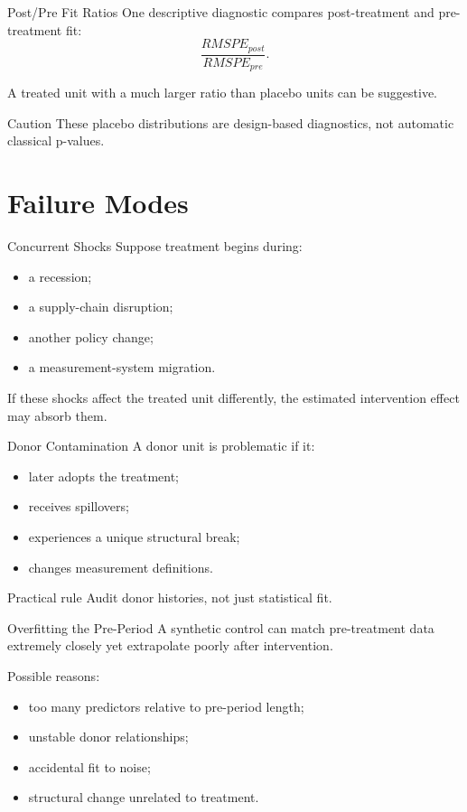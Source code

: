 \documentclass[aspectratio=169,11pt]{beamer}
\begin{document}
\begin{frame}{Post/Pre Fit Ratios}
One descriptive diagnostic compares post-treatment and pre-treatment fit:
\[
\frac{RMSPE_{post}}{RMSPE_{pre}}.
\]

A treated unit with a much larger ratio than placebo units can be suggestive.

\begin{alertblock}{Caution}
These placebo distributions are design-based diagnostics, not automatic classical p-values.
\end{alertblock}
\end{frame}

\section{Failure Modes}

\begin{frame}{Concurrent Shocks}
Suppose treatment begins during:
\begin{itemize}
\item a recession;
\item a supply-chain disruption;
\item another policy change;
\item a measurement-system migration.
\end{itemize}

If these shocks affect the treated unit differently, the estimated intervention effect may absorb them.
\end{frame}

\begin{frame}{Donor Contamination}
A donor unit is problematic if it:
\begin{itemize}
\item later adopts the treatment;
\item receives spillovers;
\item experiences a unique structural break;
\item changes measurement definitions.
\end{itemize}

\begin{block}{Practical rule}
Audit donor histories, not just statistical fit.
\end{block}
\end{frame}

\begin{frame}{Overfitting the Pre-Period}
A synthetic control can match pre-treatment data extremely closely yet extrapolate poorly after intervention.

Possible reasons:
\begin{itemize}
\item too many predictors relative to pre-period length;
\item unstable donor relationships;
\item accidental fit to noise;
\item structural change unrelated to treatment.
\end{itemize}
\end{frame}
\end{document}

